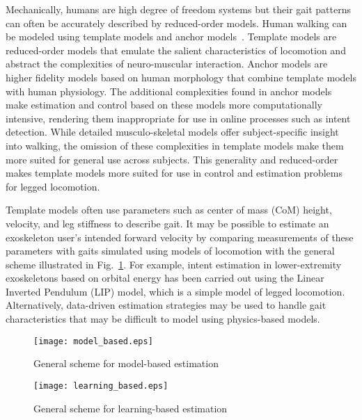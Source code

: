 Mechanically, humans are high degree of freedom systems but their gait patterns can often be accurately described by reduced-order models. Human walking can be modeled using template models and anchor models~\cite{full1999templates}. Template models are reduced-order models that emulate the salient characteristics of locomotion and abstract the complexities of neuro-muscular interaction. Anchor models are higher fidelity models based on human morphology that combine template models with human physiology. The additional complexities found in anchor models make estimation and control based on these models more computationally intensive, rendering them inappropriate for use in online processes such as intent detection. While detailed musculo-skeletal models offer subject-specific insight into walking, the omission of these complexities in template models make them more suited for general use across subjects. This generality and reduced-order makes template models more suited for use in control and estimation problems for legged locomotion.

Template models often use parameters such as center of mass (CoM) height, velocity, and leg stiffness to describe gait. It may be possible to estimate an exoskeleton user's intended forward velocity by comparing measurements of these parameters with gaits simulated using models of locomotion with the general scheme illustrated in Fig.~\ref{fig:model-based}. For example, intent estimation in lower-extremity exoskeletons based on orbital energy \cite{chen2018dynamic} has been carried out using the Linear Inverted Pendulum (LIP) model, which is a simple model of legged locomotion.  Alternatively, data-driven estimation strategies \cite{ge2011neural, kalinowska2019data, joukov2017rhythmic} may be used to handle gait characteristics that may be difficult to model using physics-based models.

\begin{figure}
	\centering
	\texttt{[image: model\_based.eps]}
	\caption{General scheme for model-based estimation}\label{fig:model-based}
\end{figure}

\begin{figure}
	\centering
	\texttt{[image: learning\_based.eps]}
	\caption{General scheme for learning-based estimation}\label{fig:learning-based}
\end{figure}

